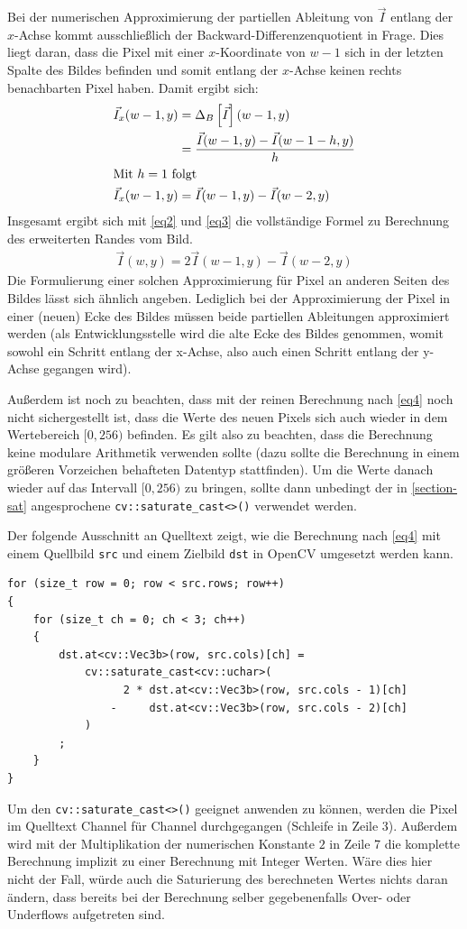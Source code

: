 \documentclass{whswinvcbook}
\begin{document}
Bei der numerischen Approximierung der partiellen Ableitung von $\vec{I}$ entlang der $x$-Achse kommt ausschließlich der Backward-Differenzenquotient in Frage. Dies liegt daran, dass die Pixel mit einer $x$-Koordinate von $w-1$ sich in der letzten Spalte des Bildes befinden und somit entlang der $x$-Achse keinen rechts benachbarten Pixel haben. Damit ergibt sich:
\begin{align} \label{eq3}
    \vec{I}_x(w-1,y) &= \Delta_B\left[\vec{I}\right](w-1,y) \nonumber \\
    &= \frac{\vec{I}(w-1,y)-\vec{I}(w-1-h,y)}{h} \nonumber \\
\shortintertext{Mit $h=1$ folgt}
    \vec{I}_x(w-1,y) &= \vec{I}(w-1,y)-\vec{I}(w-2,y)
\end{align}
Insgesamt ergibt sich mit \ref{eq2} und \ref{eq3} die vollständige Formel zu Berechnung des erweiterten Randes vom Bild.
\begin{align} \label{eq4}
    \vec{I}(w,y)=2\vec{I}(w-1,y)-\vec{I}(w-2,y)
\end{align}
Die Formulierung einer solchen Approximierung für Pixel an anderen Seiten des Bildes lässt sich ähnlich angeben. Lediglich bei der Approximierung der Pixel in einer (neuen) Ecke des Bildes müssen beide partiellen Ableitungen approximiert werden (als Entwicklungsstelle wird die alte Ecke des Bildes genommen, womit sowohl ein Schritt entlang der x-Achse, also auch einen Schritt entlang der y-Achse gegangen wird).

Außerdem ist noch zu beachten, dass mit der reinen Berechnung nach \ref{eq4} noch nicht sichergestellt ist, dass die Werte des neuen Pixels sich auch wieder in dem Wertebereich $[0,256)$ befinden. Es gilt also zu beachten, dass die Berechnung keine modulare Arithmetik verwenden sollte (dazu sollte die Berechnung in einem größeren Vorzeichen behafteten Datentyp stattfinden). Um die Werte danach wieder auf das Intervall $[0,256)$ zu bringen, sollte dann unbedingt der in \ref{section-sat} angesprochene \texttt{cv::saturate\_cast<>()} verwendet werden.

Der folgende Ausschnitt an Quelltext zeigt, wie die Berechnung nach \ref{eq4} mit einem Quellbild \texttt{src} und einem Zielbild \texttt{dst} in OpenCV umgesetzt werden kann.
\begin{lstlisting}[caption=Lineare Approximierung (nach Taylor) von Pixel am rechten Bildrand, label=lst-pred-sat]
for (size_t row = 0; row < src.rows; row++)
{
    for (size_t ch = 0; ch < 3; ch++)
    {
        dst.at<cv::Vec3b>(row, src.cols)[ch] =
            cv::saturate_cast<cv::uchar>(
                  2 * dst.at<cv::Vec3b>(row, src.cols - 1)[ch]
                -     dst.at<cv::Vec3b>(row, src.cols - 2)[ch]
            )
        ;
    }
}
\end{lstlisting}
Um den \texttt{cv::saturate\_cast<>()} geeignet anwenden zu können, werden die Pixel im Quelltext Channel für Channel durchgegangen (Schleife in Zeile 3). Außerdem wird mit der Multiplikation der numerischen Konstante $2$ in Zeile 7 die komplette Berechnung implizit zu einer Berechnung mit Integer Werten. Wäre dies hier nicht der Fall, würde auch die Saturierung des berechneten Wertes nichts daran ändern, dass bereits bei der Berechnung selber gegebenenfalls Over- oder Underflows aufgetreten sind.
\end{document}
